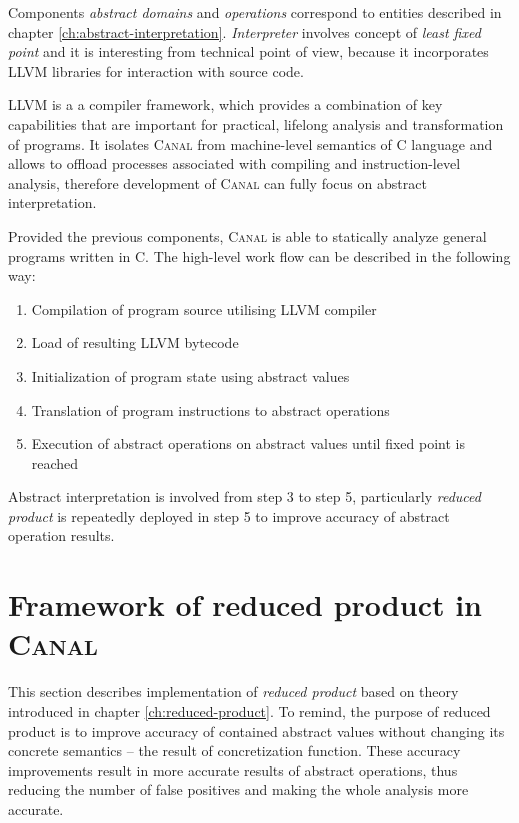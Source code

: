 \documentclass[12pt,oneside]{fithesis2}
\theoremstyle{definition}
\begin{document}
Components \textit{abstract domains} and \textit{operations} correspond to entities described in chapter \ref{ch:abstract-interpretation}. \textit{Interpreter} involves concept of \textit{least fixed point} and it is interesting from technical point of view, because it incorporates LLVM libraries for interaction with source code.

LLVM is a a compiler framework, which provides a combination of key capabilities that are important for practical, lifelong analysis and
transformation of programs. \cite{llvm} It isolates \textsc{Canal} from machine-level semantics of C language and allows to offload processes associated with compiling and instruction-level analysis, therefore development of \textsc{Canal} can fully focus on abstract interpretation.

Provided the previous components, \textsc{Canal} is able to statically analyze general programs written in C. The high-level work flow can be described in the following way:

\begin{enumerate}
  \item Compilation of program source utilising LLVM compiler
  \item Load of resulting LLVM bytecode
  \item Initialization of program state using abstract values
  \item Translation of program instructions to abstract operations
  \item Execution of abstract operations on abstract values until fixed point is reached
\end{enumerate}

Abstract interpretation is involved from step 3 to step 5, particularly \textit{reduced product} is repeatedly deployed in step 5 to improve accuracy of abstract operation results.

\section{Framework of reduced product in \textsc{Canal}}

This section describes implementation of \textit{reduced product} based on theory introduced in chapter \ref{ch:reduced-product}. To remind, the purpose of reduced product is to improve accuracy of contained abstract values without changing its concrete semantics -- the result of concretization function. These accuracy improvements result in more accurate results of abstract operations, thus reducing the number of false positives and making the whole analysis more accurate.
\end{document}
